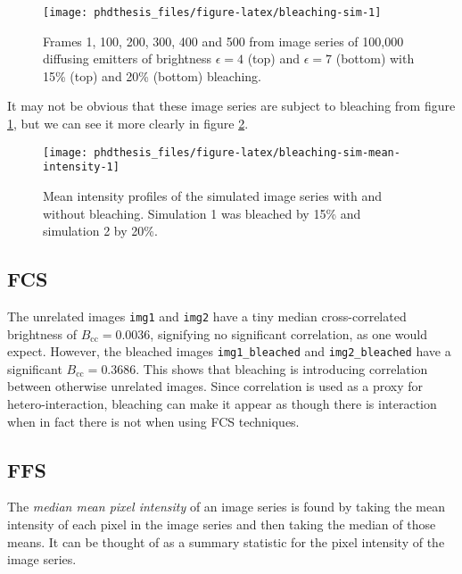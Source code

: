 \documentclass[12pt,]{book}
\theoremstyle{definition}
\theoremstyle{definition}
\theoremstyle{definition}
\theoremstyle{remark}
\let\BeginKnitrBlock\begin \let\EndKnitrBlock\end
\begin{document}
\begin{figure}

\texttt{[image: phdthesis\_files/figure-latex/bleaching-sim-1]} \hfill{}

\caption{Frames 1, 100, 200, 300, 400 and 500 from
image series of 100,000 diffusing emitters of brightness
\(\epsilon = 4\) (top) and \(\epsilon = 7\) (bottom) with 15\% (top) and
20\% (bottom) bleaching.}\label{fig:bleaching-sim}
\end{figure}

It may not be obvious that these image series are subject to bleaching
from figure \ref{fig:bleaching-sim}, but we can see it more clearly in
figure \ref{fig:bleaching-sim-mean-intensity}.





\begin{figure}

\texttt{[image: phdthesis\_files/figure-latex/bleaching-sim-mean-intensity-1]} \hfill{}

\caption{Mean intensity profiles of
the simulated image series with and without bleaching. Simulation 1 was
bleached by 15\% and simulation 2 by 20\%.}\label{fig:bleaching-sim-mean-intensity}
\end{figure}

\subsection{FCS}\label{fcs}

The unrelated images \texttt{img1} and \texttt{img2} have a tiny median
cross-correlated brightness of \(B_\text{cc} = 0.0036\), signifying no
significant correlation, as one would expect. However, the bleached
images \texttt{img1\_bleached} and \texttt{img2\_bleached} have a
significant \(B_\text{cc} = 0.3686\). This shows that bleaching is
introducing correlation between otherwise unrelated images. Since
correlation is used as a proxy for hetero-interaction, bleaching can
make it appear as though there is interaction when in fact there is not
when using FCS techniques.

\subsection{FFS}\label{ffs}

\BeginKnitrBlock{definition}[median mean pixel intensity]
\protect\hypertarget{def:unnamed-chunk-21}{}{\label{def:unnamed-chunk-21}
\iffalse (median mean pixel intensity) \fi{} }The \emph{median mean
pixel intensity} of an image series is found by taking the mean
intensity of each pixel in the image series and then taking the median
of those means. It can be thought of as a summary statistic for the
pixel intensity of the image series.
\EndKnitrBlock{definition}
\end{document}
